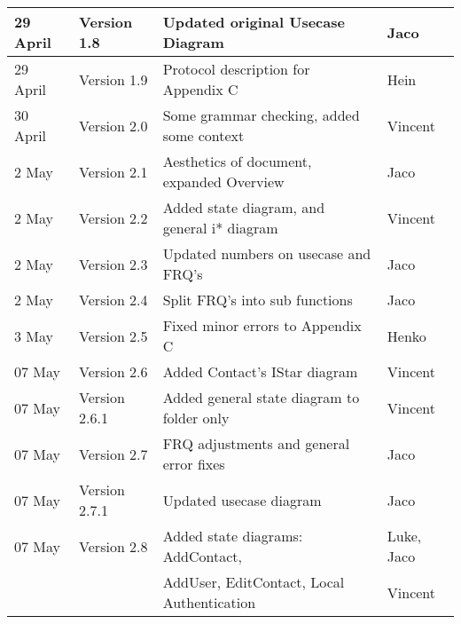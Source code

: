 \begin{center}
\begin{tabular}{|l|l|l|l|}
\hline
29 April & Version 1.8 & Updated original Usecase Diagram& Jaco\\
\hline
29 April & Version 1.9 & Protocol description for Appendix C& Hein\\
\hline
30 April & Version 2.0 & Some grammar checking, added some context & Vincent\\
\hline
2 May & Version 2.1 & Aesthetics of document, expanded Overview& Jaco\\
\hline
2 May & Version 2.2 & Added state diagram, and general i* diagram & Vincent\\
\hline
2 May & Version 2.3 & Updated numbers on usecase and FRQ's & Jaco\\
\hline
2 May & Version 2.4 & Split FRQ's into sub functions& Jaco\\
\hline
3 May & Version 2.5 & Fixed minor errors to Appendix C& Henko\\
\hline
07 May & Version 2.6 & Added Contact's IStar diagram & Vincent\\
\hline
07 May & Version 2.6.1 & Added general state diagram to folder only & Vincent\\
\hline
07 May & Version 2.7 & FRQ adjustments and general error fixes & Jaco\\
\hline
07 May & Version 2.7.1 & Updated usecase diagram& Jaco\\
\hline
07 May & Version 2.8 &Added state diagrams: AddContact, &Luke, Jaco\\
&&AddUser, EditContact, Local Authentication&Vincent\\
\hline
\end{tabular}

\begin{tabular}{|l|l|l|l|}


\end{tabular}
\end{center}
